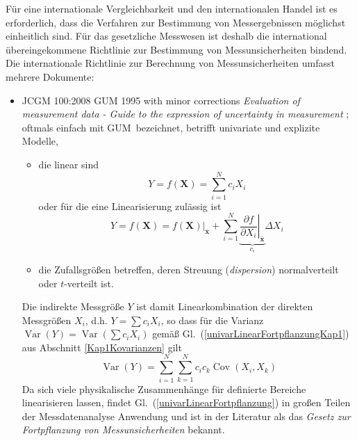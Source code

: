 Für eine internationale Vergleichbarkeit und den internationalen Handel ist es erforderlich,
dass die Verfahren zur Bestimmung von Messergebnissen möglichst einheitlich sind.
Für das gesetzliche Messwesen ist deshalb die international übereingekommene Richtlinie
zur Bestimmung von Messunsicherheiten bindend.
Die internationale Richtlinie zur Berechnung von Messunsicherheiten umfasst mehrere
Dokumente:
\begin{itemize}
\item JCGM 100:2008 GUM 1995 with minor corrections \textsl{Evaluation of measurement
data - Guide to the expression of uncertainty in measurement} \cite{GUM95}; oftmals einfach mit \glqq GUM\grqq ~bezeichnet,
betrifft univariate und explizite Modelle,
  \begin{itemize}
  \item die linear sind
  \begin{equation}
  Y = f(\mathbf{X}) = \sum_{i=1}^N c_i X_i
  \label{univarLinear}
  \end{equation}
  oder für die eine Linearisierung zulässig ist
  \begin{equation}
  Y = f(\mathbf{X})
  = \left. f(\mathbf{X}) \right|_{\bar{\mathbf{x}}} +
    \sum_{i=1}^N \underbrace{\left. \frac{\partial f}{\partial X_i} \right|_{\bar{\mathbf{x}}}}_{c_i} \Delta X_i
  \label{univarTaylorLin}
  \end{equation}
  \item die Zufallsgrößen betreffen, deren Streuung (\textsl{dispersion}) normalverteilt oder
  $t$-verteilt ist.
  \end{itemize}
Die indirekte Messgröße $Y$ ist damit Linearkombination der direkten Messgrößen $X_i$, d.h.
$Y = \sum c_i X_i$, so dass für die Varianz $\operatorname{Var}(Y) = \operatorname{Var}(\sum c_i X_i)$
gemäß Gl.~(\ref{univarLinearFortpflanzungKap1}) aus Abschnitt \ref{Kap1Kovarianzen} gilt
\begin{equation}
\operatorname{Var}(Y) = \sum_{i=1}^N \sum_{k=1}^N  c_i c_k \operatorname{Cov}(X_i, X_k)
\label{univarLinearFortpflanzung}
\end{equation}
Da sich viele physikalische Zusammenhänge für definierte Bereiche linearisieren lassen,
findet Gl.~(\ref{univarLinearFortpflanzung}) in großen Teilen der Messdatenanalyse
Anwendung und ist in der Literatur als das \textsl{Gesetz zur Fortpflanzung von Messunsicherheiten}
bekannt.


\end{itemize}
